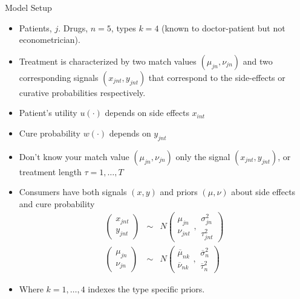\documentclass[xcolor=pdftex,dvipsnames,table,mathserif]{beamer}
\begin{document}
\begin{frame}{Model Setup}
\begin{itemize}
\item Patients, $j$. Drugs, $n=5$, types $k=4$ (known to doctor-patient but not econometrician).
\item Treatment is characterized by two match values $(\mu_{jn},\nu_{jn})$ and two corresponding signals $(x_{jnt},y_{jnt})$ that correspond to the side-effects or curative probabilities respectively.
\item Patient's utility $u(\cdot)$ depends on side effects $x_{int}$
\item Cure probability $w(\cdot)$ depends on $y_{jnt}$
\item Don't know your match value  $(\mu_{jn},\nu_{jn})$  only the signal $(x_{jnt},y_{jnt})$, or treatment length $\tau = 1,\ldots,T$
\item Consumers have both signals $(x,y)$ and priors $(\mu,\nu)$ about side effects and cure probability
\begin{eqnarray*}
\left( \begin{smallmatrix} x_{jnt} \\ y_{jnt} \end{smallmatrix} \right)
&\sim& N \left( \begin{smallmatrix} \mu_{jn} \\ \nu_{jnt} \end{smallmatrix}, \begin{smallmatrix} \sigma^2_{jn} \\ \tau_{jnt}^2 \end{smallmatrix} \right) \\
\left( \begin{smallmatrix} \mu_{jn} \\ \nu_{jn} \end{smallmatrix} \right)
&\sim& N \left( \begin{smallmatrix} \overline{\mu}_{nk} \\ \overline{\nu}_{nk} \end{smallmatrix}, \begin{smallmatrix} \overline{\sigma}^2_{n} \\ \overline{\tau}_{n}^2 \end{smallmatrix} \right)
\end{eqnarray*}
\item Where $k=1,\ldots,4$ indexes the \alert{type specific priors}. 
\end{itemize}
\end{frame}
\end{document}
